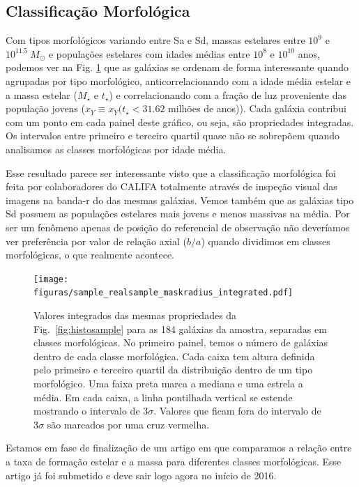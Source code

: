 \subsection{Classificação Morfológica}
\label{sec:sample:morf}

Com tipos morfológicos variando entre Sa e Sd, massas estelares entre $10^9$ e $10^{11.5}\ M_\odot$
e populações estelares com idades médias entre $10^8$ e $10^{10}$ anos, podemos ver na Fig.
\ref{fig:amostraMorf} que as galáxias se ordenam de forma interessante quando agrupadas por tipo
morfológico, anticorrelacionando com a idade média estelar e a massa estelar ($M_\star$ e $t_\star$)
e correlacionando com a fração de luz proveniente das população jovens ($x_Y \equiv x_Y(t_\star <
31.62$ milhões de anos)). Cada galáxia contribui com um ponto em cada painel deste gráfico, ou seja,
são propriedades integradas. Os intervalos entre primeiro e terceiro quartil quase não se sobrepõem
quando analisamos as classes morfológicas por idade média.

Esse resultado parece ser interessante visto que a classificação morfológica foi feita por
colaboradores do CALIFA totalmente através de inspeção visual das imagens na banda-r do \SDSS das
mesmas galáxias. Vemos também que as galáxias tipo Sd possuem as populações estelares mais jovens e
menos massivas na média. Por ser um fenômeno apenas de posição do referencial de observação não
deveríamos ver preferência por valor de relação axial ($b/a$) quando dividimos em classes
morfológicas, o que realmente acontece.

\begin{figure}
	\centering
	\texttt{[image: figuras/sample\_realsample\_maskradius\_integrated.pdf]}
	\caption[Classificação por morfologia]
	{Valores integrados das mesmas propriedades da Fig.\ \ref{fig:histosample} para as 184
galáxias da amostra, separadas em classes morfológicas. No primeiro painel, temos o número de
galáxias dentro de cada classe morfológica. Cada caixa tem altura definida pelo primeiro e terceiro
quartil da distribuição dentro de um tipo morfológico. Uma faixa preta marca a mediana e uma
estrela a média. Em cada caixa, a linha pontilhada vertical se estende mostrando o intervalo de
$3\sigma$. Valores que ficam fora do intervalo de $3\sigma$ são marcados por uma cruz vermelha.}
	\label{fig:amostraMorf}
\end{figure}

Estamos em fase de finalização de um artigo em que comparamos a relação entre a taxa de formação
estelar e a massa para diferentes classes morfológicas. Esse artigo já foi submetido e deve sair
logo agora no início de 2016.


